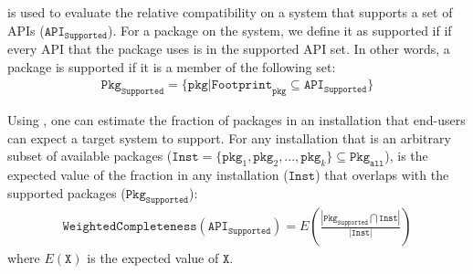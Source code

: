 

\begin{comment}
We defined {\bf platform compatibility} as "{\em the probability of porting any installation of an OS distribution onto the target OS without any effort}".
The definition of an {\em installation} is a combination of application setup on a standalone OS instance.
An Installation can exist on physical machines,
or any machines of generalized sense such as a virtual machines, containers or subsystems.
In our model, installations represent customers of the OS, who are considered equal when providing any services.
\end{comment}

\vspace{0.1in}
{\noindent
{}}
\vspace{0.1in}

\Compatmetric{} is used to evaluate the relative compatibility on a system that
supports a set of APIs ($\mathtt{API}_\mathtt{Supported}$).
For a package on the system, we define it as supported if 
if every API that the package uses is in the supported API set.
In other words, a package is supported if it is a member of the following set:
\begin{align*}
\mathtt{Pkg}_\mathtt{Supported} = \{\mathtt{pkg} | \mathtt{Footprint}_\mathtt{pkg} \subseteq \mathtt{API}_\mathtt{Supported}\}
\end{align*}

\noindent
Using \compatmetric{}, one can estimate the fraction of packages in an installation that end-users can expect a target system to support.
For any installation
that is an arbitrary subset of available packages
($\mathtt{Inst} = \{\mathtt{pkg}_1, \mathtt{pkg}_2, ..., \mathtt{pkg}_k\} \subseteq \mathtt{Pkg}_\mathtt{all}$),
\compatmetric{} is the expected value of
the fraction in any installation ($\mathtt{Inst}$)
that overlaps with the supported packages ($\mathtt{Pkg}_\mathtt{Supported}$):
\begin{align*}
\mathtt{Weighted Completeness}(\mathtt{API}_\mathtt{Supported}) =
E(\frac{|\mathtt{Pkg}_\mathtt{Supported} \bigcap \mathtt{Inst}|}{|\mathtt{Inst}|}) 
\end{align*}
where $E(\mathtt{X})$ is the expected value of $\mathtt{X}$.


